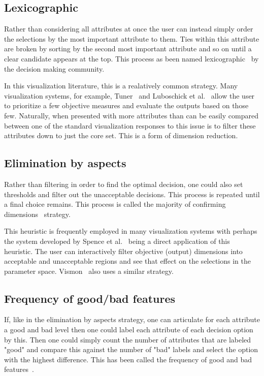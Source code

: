 \subsection{Lexicographic}\label{lexicographic}

Rather than considering all attributes at once the user can instead simply
order the selections by the most important attribute to them. Ties within this
attribute are broken by sorting by the second most important attribute and so
on until a clear candidate appears at the top. This process as been named
lexicographic~\citep{ref} by the decision making community.

In this visualization literature, this is a realatively common strategy.
Many visualization systems, for example, Tuner~\cite{Torsney-Weir:2011} and
Luboschick et al.~\citep{Luboschik:2014} allow the user to prioritize a few
objective measures and evaluate the outputs based on those few. Naturally,
when presented with more attributes than can be easily compared between
one of the standard visualization responses to this issue is to filter
these attributes down to just the core set. This is a form of dimension 
reduction.

\subsection{Elimination by aspects}\label{elimination-by-aspects}

Rather than filtering in order to find the optimal decision, one could
also set thresholds and filter out the unacceptable decisions. This process
is repeated until a final choice remains. This process is called
the majority of confirming dimensions~\cite{ref} strategy. 

This heuristic is frequently employed in many visualization systems with
perhaps the system developed by Spence et al.~\citep{Spence:1995} being a
direct application of this heuristic. The user can interactively filter
objective (output) dimensions into acceptable and unacceptable regions and
see that effect on the selections in the parameter space. 
Vismon~\cite{ref} also uses a similar strategy.

\subsection{Frequency of good/bad
features}\label{frequency-of-goodbad-features}

If, like in the elimination by aspects strategy, one can articulate for
each attribute a good and bad level then one could label each attribute
of each decision option by this. Then one could simply count the number of
attributes that are labeled "good" and compare this against the number of
"bad" labels and select the option with the highest difference. This has
been called the frequency of good and bad features~\citep{ref}.

